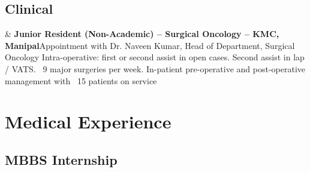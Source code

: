 \documentclass[10pt, letterpaper]{article}
\newcommand{\Year}[1]{\fontsize{9pt}{0}\selectfont #1}
\newcommand{\Twoline}[2]{\textbf{#1}\newline  #2}
\begin{document}
\subsection{Clinical}
\begin{EntriesTable}
  \Year{2021} &
  \Twoline{Junior Resident (Non-Academic) – Surgical Oncology – KMC, Manipal}
  {Appointment with Dr. Naveen Kumar, Head of Department, Surgical Oncology\newline
  Intra-operative: first or second assist in open cases. Second assist in lap / VATS. ~9 major surgeries per week.\newline
  In-patient pre-operative and post-operative management with ~15 patients on service\newline
  }
\end{EntriesTable}


\section{Medical Experience}
\subsection{MBBS Internship}
\end{document}
